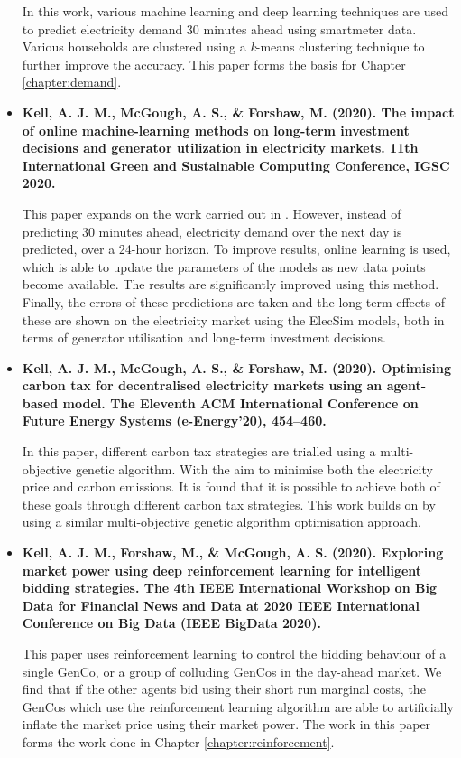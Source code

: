 \begin{itemize}
	In this work, various machine learning and deep learning techniques are used to predict electricity demand 30 minutes ahead using \gls{smartmeter} data. Various households are clustered using a \textit{k}-means clustering technique to further improve the accuracy. This paper forms the basis for Chapter \ref{chapter:demand}.
	
	\item[\textbf{\cite{Kell2020c}}] \textbf{Kell, A. J. M., McGough, A. S., \& Forshaw, M. (2020). The impact of online machine-learning methods on long-term investment decisions and generator utilization in electricity markets. 11th International Green and Sustainable Computing Conference, IGSC 2020.}
	
	This paper expands on the work carried out in \cite{Kell2018a}. However, instead of predicting 30 minutes ahead, electricity demand over the next day is predicted, over a 24-hour horizon. To improve results, online learning is used, which is able to update the parameters of the models as new data points become available. The results are significantly improved using this method. Finally, the errors of these predictions are taken and the long-term effects of these are shown on the electricity market using the ElecSim models, both in terms of generator utilisation and long-term investment decisions.

	
	\item[\textbf{\cite{Kell2020a}}] \textbf{Kell, A. J. M., McGough, A. S., \& Forshaw, M. (2020). Optimising carbon tax for decentralised electricity markets using an agent-based model. The Eleventh ACM International Conference on Future Energy Systems (e-Energy’20), 454–460.}
	
	In this paper, different carbon tax strategies are trialled using a multi-objective genetic algorithm. With the aim to minimise both the electricity price and carbon emissions. It is found that it is possible to achieve both of these goals through different carbon tax strategies. This work builds on \cite{Kell2019} by using a similar multi-objective genetic algorithm optimisation approach. 
	
		\item[\textbf{\cite{Kell2020d}}] \textbf{Kell, A. J. M., Forshaw, M., \& McGough, A. S. (2020). Exploring market power using deep reinforcement learning for intelligent bidding strategies. The 4th IEEE International Workshop on Big Data for Financial News and Data at 2020 IEEE International Conference on Big Data (IEEE BigData 2020).}
	
		This paper uses reinforcement learning to control the bidding behaviour of a single GenCo, or a group of colluding GenCos in the day-ahead market. We find that if the other agents bid using their short run marginal costs, the GenCos which use the reinforcement learning algorithm are able to artificially inflate the market price using their market power. The work in this paper forms the work done in Chapter \ref{chapter:reinforcement}.
\end{itemize}


